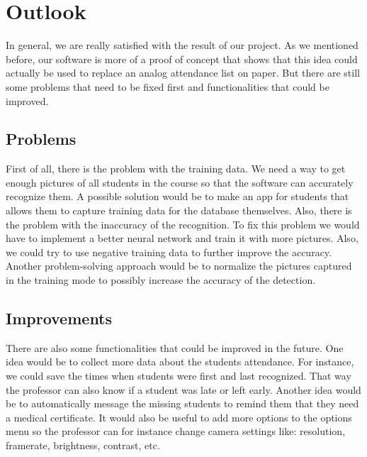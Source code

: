 \documentclass[12pt, a4paper]{article}
\begin{document}
\newpage



\section{Outlook}
In general, we are really satisfied with the result of our project. As we mentioned before, our software is more of a proof of concept that shows that this idea could actually be used to replace an analog attendance list on paper. But there are still some problems that need to be fixed first and functionalities that could be improved. 

\subsection{Problems}
First of all, there is the problem with the training data. We need a way to get enough pictures of all students in the course so that the software can accurately recognize them. A possible solution would be to make an app for students that allows them to capture training data for the database themselves. Also, there is the problem with the inaccuracy of the recognition. To fix this problem we would have to implement a better neural network and train it with more pictures. Also, we could  try to use negative training data to further improve the accuracy. Another problem-solving approach would be to normalize the pictures captured in the training mode to possibly increase the accuracy of the detection. 

\subsection{Improvements}
There are also some functionalities that could be improved in the future. One idea would be to collect more data about the students attendance. For instance, we could save the times when students were first and last recognized. That way the professor can also know if a student was late or left early. Another idea would be to automatically message the missing students to remind them that they need a medical certificate. It would also be useful to add more options to the options menu so the professor can for instance change camera settings like: resolution, framerate, brightness, contrast, etc. 
\newpage

\end{document}

